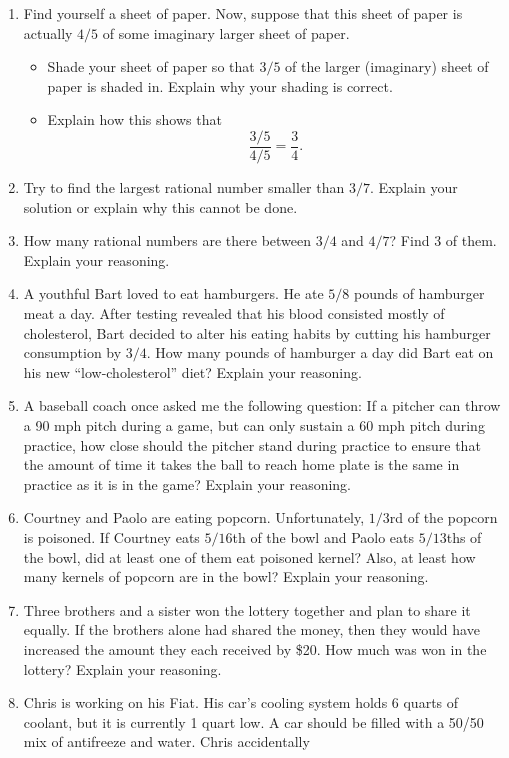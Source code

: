 \begin{problems}
\begin{enumerate}
\item Find yourself a sheet of paper. Now, suppose that this sheet of
  paper is actually $4/5$ of some imaginary larger sheet of
  paper. 
\begin{itemize}
\item Shade your sheet of paper so that $3/5$ of the larger
  (imaginary) sheet of paper is shaded in. Explain why your shading is
  correct.
\item Explain how this shows that 
\[
\frac{3/5}{4/5} = \frac{3}{4}.
\]
\end{itemize}
\item Try to find the largest rational number smaller than $3/7$.
  Explain your solution or explain why this cannot be done.
\item How many rational numbers are there between $3/4$ and $4/7$?
  Find $3$ of them. Explain your reasoning.
\item A youthful Bart loved to eat hamburgers. He ate $5/8$ pounds of
  hamburger meat a day. After testing revealed that his blood
  consisted mostly of cholesterol, Bart decided to alter his eating
  habits by cutting his hamburger consumption by $3/4$. How many
  pounds of hamburger a day did Bart eat on his new
  ``low-cholesterol'' diet?  Explain your reasoning.
\item A baseball coach once asked me the following question: If a
  pitcher can throw a 90 mph pitch during a game, but can only
  sustain a 60 mph pitch during practice, how close should the pitcher
  stand during practice to ensure that the amount of time it takes the
  ball to reach home plate is the same in practice as it is in the
  game? Explain your reasoning.
\item Courtney and Paolo are eating popcorn. Unfortunately, $1/3$rd of
  the popcorn is poisoned. If Courtney eats $5/16$th of the bowl and
  Paolo eats $5/13$ths of the bowl, did at least one of them eat
  poisoned kernel? Also, at least how many kernels of popcorn are in
  the bowl? Explain your reasoning.
\item Three brothers and a sister won the lottery together and plan to
  share it equally. If the brothers alone had shared the money, then
  they would have increased the amount they each received by \$20. How
  much was won in the lottery? Explain your reasoning.
\item Chris is working on his Fiat. His car's cooling system holds 6
  quarts of coolant, but it is currently 1 quart low. A car should be
  filled with a 50/50 mix of antifreeze and water. Chris accidentally

\end{enumerate}
\end{problems}
